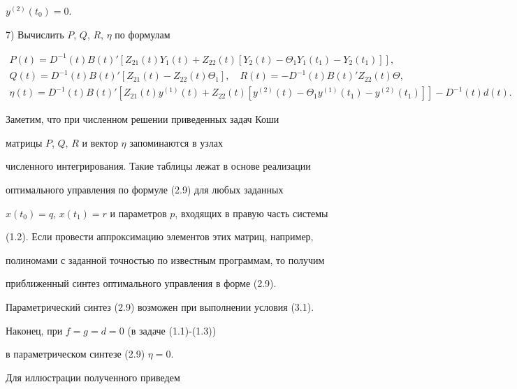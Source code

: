 $y^{(2)}(t_{0})=0$.





\noindent


7) Вычислить $P$, $Q$, $R$, $\eta$ по формулам


\begin{gather*}


P(t)=D^{-1}(t)B(t)'[Z_{21}(t)Y_{1}(t)+Z_{22}(t)[Y_{2}(t)-


\Theta _{1}Y_{1}(t_{1})-Y_{2}(t_{1})]], \\


%


Q(t)=D^{-1}(t)B(t)'[Z_{21}(t)-Z_{22}(t)\Theta_{1}], \quad


R(t)=-D^{-1}(t)B(t)'Z_{22}(t)\Theta, \\


\eta (t)=D^{-1}(t)B(t)'[Z_{21}(t)y^{(1)}(t)+Z_{22}(t)[y^{(2)}(t)-


\Theta_{1}y^{(1)}(t_{1})-y^{(2)}(t_{1})]]-D^{-1}(t)d(t).


\end{gather*}





Заметим, что при численном решении приведенных задач Коши 


матрицы $P$, $Q$, $R$ и вектор $\eta$ запоминаются в узлах 


численного интегрирования. Такие таблицы лежат в основе реализации 


оптимального управления по формуле (2.9) для любых заданных 


$x(t_{0})=q$, $x(t_{1})=r$ и параметров $p$, входящих в правую часть системы 


(1.2). Если провести аппроксимацию элементов этих матриц, например, 


полиномами с заданной точностью по известным программам, то получим 


приближенный синтез оптимального управления в форме (2.9). 


Параметрический синтез (2.9) возможен при выполнении условия (3.1).





Наконец, при $f=g=d=0$ (в задаче (1.1)-(1.3))


в параметрическом синтезе (2.9) $\eta =0$.





Для иллюстрации полученного приведем 


